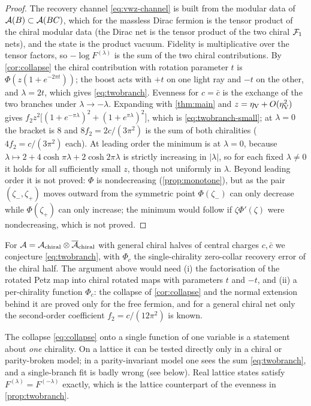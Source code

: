 \begin{proof}
The recovery channel \eqref{eq:vwz-channel} is built from the modular data of
$\mathcal A(B)\subset\mathcal A(BC)$, which for the massless Dirac fermion is the tensor product of
the chiral modular data (the Dirac net is the tensor product of the two chiral $\mathcal F_1$ nets), and the state is the product vacuum.  Fidelity is
multiplicative over the tensor factors, so $-\log F^{(\lambda)}$ is the sum of the
two chiral contributions.  By \cref{cor:collapse} the chiral contribution with
rotation parameter $t$ is $\Phi(z(1+e^{-2\pi t}))$; the boost acts with $+t$ on
one light ray and $-t$ on the other, and $\lambda=2t$, which gives
\eqref{eq:twobranch}.  Evenness for $c=\bar c$ is the exchange of the two branches
under $\lambda\to-\lambda$.  Expanding with \cref{thm:main} and $z=\eta_{\rm V}
+O(\eta_{\rm V}^2)$ gives
$f_2z^2\bigl[(1+e^{-\pi\lambda})^2+(1+e^{\pi\lambda})^2\bigr]$, which is
\eqref{eq:twobranch-small}; at $\lambda=0$ the bracket is $8$ and
$8f_2=2c/(3\pi^2)$ is the sum of both chiralities ($4f_2=c/(3\pi^2)$ each).  At leading order the minimum is at $\lambda=0$, because
$\lambda\mapsto2+4\cosh\pi\lambda+2\cosh2\pi\lambda$ is strictly increasing in
$|\lambda|$, so for each fixed $\lambda\neq0$ it holds for all sufficiently small $z$, though not uniformly in $\lambda$.  Beyond leading order it is not proved: $\Phi$ is nondecreasing
(\cref{prop:monotone}), but as the pair $(\zeta_-,\zeta_+)$ moves outward from the
symmetric point $\Phi(\zeta_-)$ can only decrease while $\Phi(\zeta_+)$ can only increase; the minimum would follow if $\zeta\Phi'(\zeta)$ were nondecreasing, which is not proved.
\end{proof}

\begin{remark}\label{rem:twobranch-general}
For $\mathcal A=\mathcal A_{\rm chiral}\otimes\overline{\mathcal A}_{\rm chiral}$ with general chiral halves of central charges $c,\bar c$ we conjecture \eqref{eq:twobranch}, with $\Phi_c$ the single-chirality zero-collar recovery error of the chiral half.  The argument above would need (i) the factorisation of the rotated Petz map into chiral rotated maps with parameters $t$ and $-t$, and (ii) a per-chirality function $\Phi_c$: the collapse of \cref{cor:collapse} and the normal extension behind it are proved only for the free fermion, and for a general chiral net only the second-order coefficient $f_2=c/(12\pi^2)$ is known.
\end{remark}

\begin{remark}
The collapse \eqref{eq:collapse} onto a single function of one variable is a
statement about \emph{one} chirality.  On a lattice it can be tested directly only
in a chiral or parity-broken model; in a parity-invariant model one sees the sum
\eqref{eq:twobranch}, and a single-branch fit is badly wrong (see below).  Real
lattice states satisfy $F^{(\lambda)}=F^{(-\lambda)}$ exactly, which is the
lattice counterpart of the evenness in \cref{prop:twobranch}.
\end{remark}

